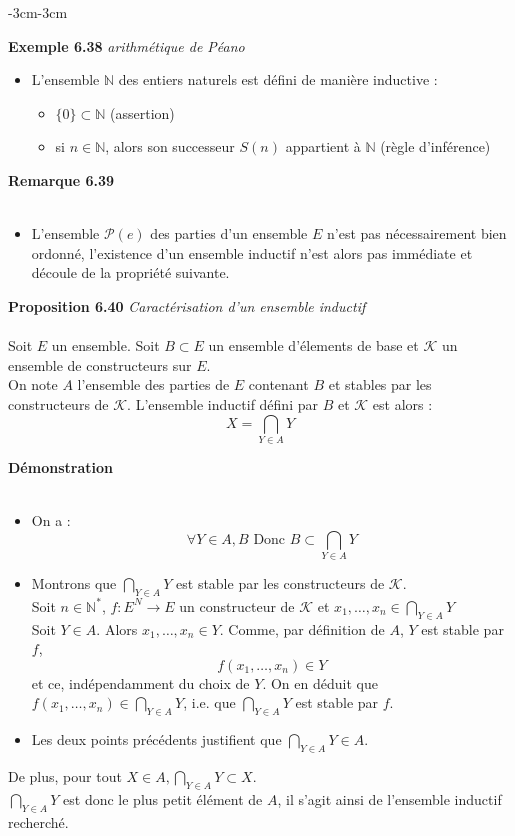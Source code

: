 \documentclass{article}
\newenvironment{exemple}[2]
{
    \begin{boite_exemple}
    \textbf{\textcolor{bleu_fonce}{Exemple #1}} \textit{#2} \\
    \begin{itemize}[label=$\blacktriangleright \quad $]                    
}
{   
    \end{itemize}
    \end{boite_exemple}
    \vspace{15pt}
}
\newenvironment{proposition}[2]
{
    \begin{boite_proposition}
    \textbf{\textcolor{rouge_fonce}{Proposition #1}} \textit{#2} \\ \\
}
{
    \end{boite_proposition}
    \vspace{15pt}
}
\newenvironment{demonstration}
{
    \begin{boite_demonstration}
    \textbf{\textcolor{rouge_fonce}{Démonstration}}\\ \\
}
{
    \end{boite_demonstration}
    \vspace{15pt}
}
\newenvironment{remarque}[2]
{
    \begin{boite_remarque}
    \textbf{\textcolor{bleu_fonce}{Remarque #1}}\textit{#2} \\ \\
    \begin{itemize}[label=$\blacktriangleright \quad $ ]                    
}
{   
    \end{itemize}
    \end{boite_remarque}
    
}
\begin{document}
\begin{adjustwidth}{-3cm}{-3cm}
        \begin{exemple}{6.38}{arithmétique de Péano}
            \item L'ensemble $\mathbb{N}$ des entiers naturels est défini de manière inductive :\begin{itemize}
                \item $\{0\} \subset \mathbb{N}$ (assertion)
                \item si $n \in \mathbb{N}$, alors son successeur $S(n)$ appartient à $\mathbb{N}$ (règle d'inférence)
            \end{itemize}
        \end{exemple}

        \begin{remarque}{6.39}{}
            \item L'ensemble $\mathcal{P}(e)$ des parties d'un ensemble $E$ n'est pas nécessairement bien ordonné, l'existence d'un ensemble inductif n'est alors pas immédiate et découle de la propriété suivante.       
        \end{remarque}

        \begin{proposition}{6.40}{Caractérisation d'un ensemble inductif}
            Soit $E$ un ensemble. Soit $B \subset E$ un ensemble d'élements de base et $\mathcal{K}$ un ensemble de constructeurs sur $E$. \\ On note $A$ l'ensemble des parties de $E$ contenant $B$ et stables par les constructeurs de $\mathcal{K}$. L'ensemble inductif défini par $B$ et $\mathcal{K}$ est alors : $$X = \bigcap_{Y \in A}Y$$
        \end{proposition}

        \begin{demonstration}
            \begin{itemize}
                \item On a : $$\forall Y \in A, B \text{ Donc } B \subset \bigcap_{Y \in A} Y$$ 
                \item Montrons que $\bigcap_{Y \in A} Y$ est stable par les constructeurs de $\mathcal{K}$. \\ Soit $n \in \mathbb{N}^*$, $f:E^N \rightarrow E$ un constructeur de $\mathcal{K}$ et $x_1, \ldots, x_n \in \bigcap_{Y \in A} Y$ \\ Soit $Y \in A$. Alors $x_1, \ldots, x_n \in Y$. Comme, par définition de $A$, $Y$ est stable par $f$, $$f(x_1, \ldots, x_n) \in Y$$ et ce, indépendamment du choix de $Y$. On en déduit que $f(x_1, \ldots, x_n) \in \bigcap_{Y \in A} Y$, i.e. que $\bigcap_{Y \in A} Y$ est stable par $f$. 
                \item Les deux points précédents justifient que $\bigcap_{Y \in A} Y \in A$.
            \end{itemize}
            De plus, pour tout $X \in A, \bigcap_{Y \in A} Y \subset X$. \\ $\bigcap_{Y \in A} Y$ est donc le plus petit élément de $A$, il s'agit ainsi de l'ensemble inductif recherché.
        \end{demonstration}


\end{adjustwidth}
\end{document}
